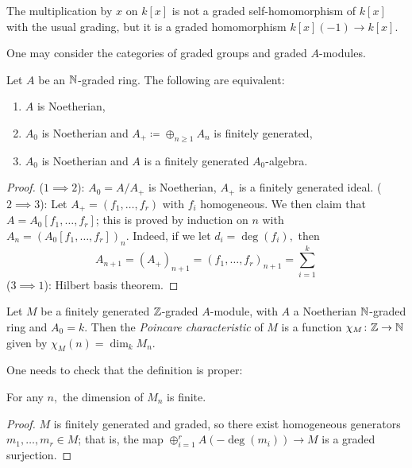 \begin{example}
  The multiplication by \(x\) on \(k[x]\) is not a graded self-homomorphism of \(k[x]\) with the usual grading, but it is a graded homomorphism \(k[x](-1) \to k[x].\)
\end{example}

One may consider the categories of graded groups and graded \(A\)-modules.

\begin{prop}
  Let \(A\) be an \(\mathbb N\)-graded ring. The following are equivalent:
  \begin{enumerate}
  \item \(A\) is Noetherian,
  \item \(A_0\) is Noetherian and \(A_+ \coloneqq \oplus_{n \geq 1} A_n\) is finitely generated,
  \item \(A_0\) is Noetherian and \(A\) is a finitely generated \(A_0\)-algebra.
  \end{enumerate}
\end{prop}
\begin{proof}
  (\(1 \implies 2\)): \(A_0 = A / {A_+}\) is Noetherian, \(A_+\) is a finitely generated ideal.
  (\(2 \implies 3\)): Let \(A_+ = (f_1, \dotsc, f_r)\) with \(f_i\) homogeneous. We then claim that \(A = A_0[f_1, \dotsc, f_r]\); this is proved by induction on \(n\) with
  \(A_n = (A_0[f_1, \dotsc, f_r])_n.\) Indeed, if we let \(d_i = \deg(f_i),\) then
  \[A_{n+1} = (A_+)_{n+1} = (f_1, \dotsc, f_r)_{n+1} = \sum_{i=1}^k\]
  (\(3 \implies 1\)): Hilbert basis theorem.
\end{proof}

\begin{df}
  Let \(M\) be a finitely generated \(\mathbb Z\)-graded \(A\)-module, with \(A\) a Noetherian \(\mathbb N\)-graded ring and \(A_0 = k.\) Then the \emph{Poincare characteristic} of \(M\) is a function \(\chi_M \colon \mathbb Z \to \mathbb N\) given by
  \(\chi_M(n) = \dim_k M_n.\)
\end{df}

One needs to check that the definition is proper:

\begin{lemma}
  For any \(n,\) the dimension of \(M_n\) is finite.
\end{lemma}
\begin{proof}
  \(M\) is finitely generated and graded, so there exist homogeneous generators \(m_1, \dotsc, m_r \in M\); that is, the map
  \(\oplus_{i=1}^r A(-\deg(m_i)) \to M\)
  is a graded surjection.
\end{proof}

